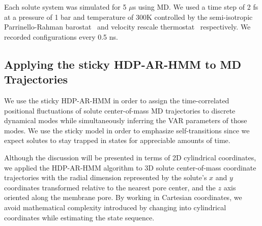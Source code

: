 \documentclass[journal=jpcbfk,manuscript=article]{achemso}
\begin{document}
  Each solute system was simulated for 5 $\mu$s using MD. We used a time step of 2 
  fs at a pressure of 1 bar and temperature of 300K controlled by the semi-isotropic 
  Parrinello-Rahman 
  barostat~\cite{parrinello_polymorphic_1981} and velocity rescale 
  thermostat~\cite{bussi_canonical_2007} respectively. We recorded configurations every 0.5 ns.

  \subsection{Applying the sticky HDP-AR-HMM to MD Trajectories}\label{method:HDP-AR-HMM}

  We use the sticky HDP-AR-HMM in order to assign the time-correlated positional 
  fluctuations of solute center-of-mass MD trajectories to discrete dynamical modes while 
  simultaneously inferring the VAR parameters of those modes. We use the sticky model
  in order to emphasize self-transitions since we expect solutes to stay trapped in
  states for appreciable amounts of time. 
  
  Although the discussion will be presented in terms of 2D cylindrical coordinates, we
  applied the HDP-AR-HMM algorithm to 3D solute center-of-mass coordinate trajectories 
  with the radial dimension represented by the solute's $x$ and $y$ coordinates 
  transformed relative to the nearest pore center, and the $z$ axis oriented along 
  the membrane pore. By working in Cartesian coordinates, we avoid mathematical 
  complexity introduced by changing into cylindrical coordinates while
  estimating the state sequence.
  
\end{document}
